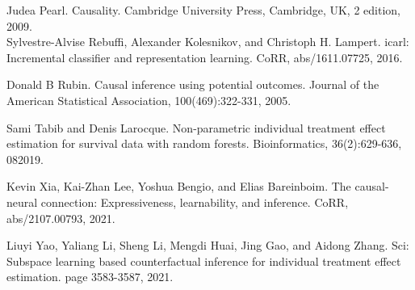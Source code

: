\documentclass[10pt]{article}
\begin{document}
Judea Pearl. Causality. Cambridge University Press, Cambridge, UK, 2 edition, 2009.\\
Sylvestre-Alvise Rebuffi, Alexander Kolesnikov, and Christoph H. Lampert. icarl: Incremental classifier and representation learning. CoRR, abs/1611.07725, 2016.

Donald B Rubin. Causal inference using potential outcomes. Journal of the American Statistical Association, 100(469):322-331, 2005.

Sami Tabib and Denis Larocque. Non-parametric individual treatment effect estimation for survival data with random forests. Bioinformatics, 36(2):629-636, 082019.

Kevin Xia, Kai-Zhan Lee, Yoshua Bengio, and Elias Bareinboim. The causal-neural connection: Expressiveness, learnability, and inference. CoRR, abs/2107.00793, 2021.

Liuyi Yao, Yaliang Li, Sheng Li, Mengdi Huai, Jing Gao, and Aidong Zhang. Sci: Subspace learning based counterfactual inference for individual treatment effect estimation. page 3583-3587, 2021.
\end{document}
